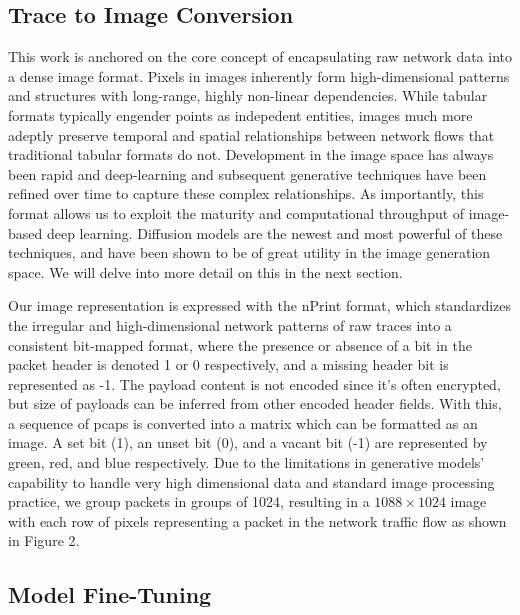 \documentclass[sigconf, nonacm]{acmart}
\begin{document}
\subsection{Trace to Image Conversion}
This work is anchored on the core concept of encapsulating raw network data
into a dense image format. Pixels in images inherently form high-dimensional 
patterns and structures with long-range, highly non-linear dependencies.
While tabular formats typically engender points as indepedent entities, images 
much more adeptly preserve temporal and spatial relationships between network
flows that traditional tabular formats do not. Development in the image space has always been
rapid and deep-learning and subsequent generative techniques have been refined 
over time to capture these complex relationships. As importantly, this format
allows us to exploit the maturity and computational throughput
of image-based deep learning. Diffusion models are
the newest and most powerful of these techniques, and have been shown to be of
great utility in the image generation space. We will delve into more detail on
this in the next section.

Our image representation is expressed with the nPrint \cite{holland2022towards} format, which
standardizes the irregular and high-dimensional network patterns of raw 
traces into a consistent bit-mapped format, where the presence or absence of a bit
in the packet header is denoted 1 or 0 respectively, and a missing header bit is
represented as -1. The payload content is not encoded since it's often encrypted, 
but size of payloads can be inferred from other encoded header fields. 
With this, a sequence of pcaps is converted into a matrix which can be formatted
as an image. A set bit (1), an unset bit (0), and a vacant bit (-1) are 
represented by green, red, and blue respectively. 
Due to the limitations in generative models’ capability to handle very high
dimensional data and standard image processing practice, we group packets in 
groups of 1024, resulting in a $1088 \times 1024$ image with each row of pixels
representing a packet in the network traffic flow as shown in Figure 2. 

\subsection{Model Fine-Tuning}
\end{document}
